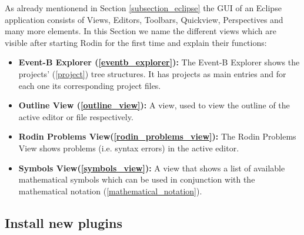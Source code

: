 As already mentionend in Section \ref{subsection_eclipse} the GUI of an Eclipse application consists of Views, Editors, Toolbars, Quickview, Perspectives and many more elements. In this Section we name the different views which are visible after starting Rodin for the first time and explain their functions:

\begin{itemize}
	\item \textbf{Event-B Explorer (\ref{eventb_explorer}):} The Event-B Explorer shows the projects' (\ref{project}) tree structures. It has projects as main entries and for each one its corresponding project files.
	\item \textbf{Outline View (\ref{outline_view}):} A view, used to view the outline of the active editor or file respectively.
	\item \textbf{Rodin Problems View(\ref{rodin_problems_view}):} The Rodin Problems View shows problems (i.e. syntax errors) in the active editor.
	\item \textbf{Symbols View(\ref{symbols_view}):} A view that shows a list of available mathematical symbols which can be used in conjunction with the mathematical notation (\ref{mathematical_notation}).
\end{itemize}

\subsection{Install new plugins}
